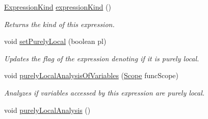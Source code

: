 \begin{DoxyCompactItemize}
\item 
\hyperlink{enumedu_1_1udel_1_1cis_1_1vsl_1_1civl_1_1model_1_1IF_1_1expression_1_1Expression_1_1ExpressionKind}{Expression\+Kind} \hyperlink{classedu_1_1udel_1_1cis_1_1vsl_1_1civl_1_1model_1_1common_1_1expression_1_1CommonVariableExpression_a9d82fc1d8b16a74db48b2f7563202cfa}{expression\+Kind} ()
\begin{DoxyCompactList}\small\item\em Returns the kind of this expression. \end{DoxyCompactList}\item 
void \hyperlink{classedu_1_1udel_1_1cis_1_1vsl_1_1civl_1_1model_1_1common_1_1expression_1_1CommonVariableExpression_a5b508f75d4e85790c528bebe7551a63c}{set\+Purely\+Local} (boolean pl)
\begin{DoxyCompactList}\small\item\em Updates the flag of the expression denoting if it is purely local. \end{DoxyCompactList}\item 
void \hyperlink{classedu_1_1udel_1_1cis_1_1vsl_1_1civl_1_1model_1_1common_1_1expression_1_1CommonVariableExpression_a97555fce345bdc2023e5362c90279015}{purely\+Local\+Analysis\+Of\+Variables} (\hyperlink{interfaceedu_1_1udel_1_1cis_1_1vsl_1_1civl_1_1model_1_1IF_1_1Scope}{Scope} func\+Scope)
\begin{DoxyCompactList}\small\item\em Analyzes if variables accessed by this expression are purely local. \end{DoxyCompactList}\item 
\hypertarget{classedu_1_1udel_1_1cis_1_1vsl_1_1civl_1_1model_1_1common_1_1expression_1_1CommonVariableExpression_a6d0e2e287288e063b8b34e0abf0fecd8}{}void \hyperlink{classedu_1_1udel_1_1cis_1_1vsl_1_1civl_1_1model_1_1common_1_1expression_1_1CommonVariableExpression_a6d0e2e287288e063b8b34e0abf0fecd8}{purely\+Local\+Analysis} ()\label{classedu_1_1udel_1_1cis_1_1vsl_1_1civl_1_1model_1_1common_1_1expression_1_1CommonVariableExpression_a6d0e2e287288e063b8b34e0abf0fecd8}


\end{DoxyCompactItemize}

